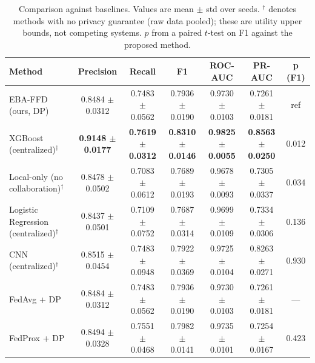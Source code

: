 \begin{table}[htbp]
\centering
\caption{Comparison against baselines. Values are mean $\pm$ std over seeds. $^{\dagger}$ denotes methods with no privacy guarantee (raw data pooled); these are utility upper bounds, not competing systems. $p$ from a paired $t$-test on F1 against the proposed method.}
\label{tab:comparison}
\begin{tabular}{lcccccc}
\toprule
Method & Precision & Recall & F1 & ROC-AUC & PR-AUC & p (F1) \\
\midrule
EBA-FFD (ours, DP) & 0.8484 $\pm$ 0.0312 & 0.7483 $\pm$ 0.0562 & 0.7936 $\pm$ 0.0190 & 0.9730 $\pm$ 0.0103 & 0.7261 $\pm$ 0.0181 & ref \\
XGBoost (centralized)$^{\dagger}$ & \textbf{0.9148 $\pm$ 0.0177} & \textbf{0.7619 $\pm$ 0.0312} & \textbf{0.8310 $\pm$ 0.0146} & \textbf{0.9825 $\pm$ 0.0055} & \textbf{0.8563 $\pm$ 0.0250} & 0.012 \\
Local-only (no collaboration)$^{\dagger}$ & 0.8478 $\pm$ 0.0502 & 0.7083 $\pm$ 0.0612 & 0.7689 $\pm$ 0.0193 & 0.9678 $\pm$ 0.0093 & 0.7305 $\pm$ 0.0337 & 0.034 \\
Logistic Regression (centralized)$^{\dagger}$ & 0.8437 $\pm$ 0.0501 & 0.7109 $\pm$ 0.0752 & 0.7687 $\pm$ 0.0314 & 0.9699 $\pm$ 0.0109 & 0.7334 $\pm$ 0.0306 & 0.136 \\
CNN (centralized)$^{\dagger}$ & 0.8515 $\pm$ 0.0454 & 0.7483 $\pm$ 0.0948 & 0.7922 $\pm$ 0.0369 & 0.9725 $\pm$ 0.0104 & 0.8263 $\pm$ 0.0271 & 0.930 \\
FedAvg + DP & 0.8484 $\pm$ 0.0312 & 0.7483 $\pm$ 0.0562 & 0.7936 $\pm$ 0.0190 & 0.9730 $\pm$ 0.0103 & 0.7261 $\pm$ 0.0181 & --- \\
FedProx + DP & 0.8494 $\pm$ 0.0328 & 0.7551 $\pm$ 0.0468 & 0.7982 $\pm$ 0.0141 & 0.9735 $\pm$ 0.0101 & 0.7254 $\pm$ 0.0167 & 0.423 \\
\bottomrule
\end{tabular}
\end{table}